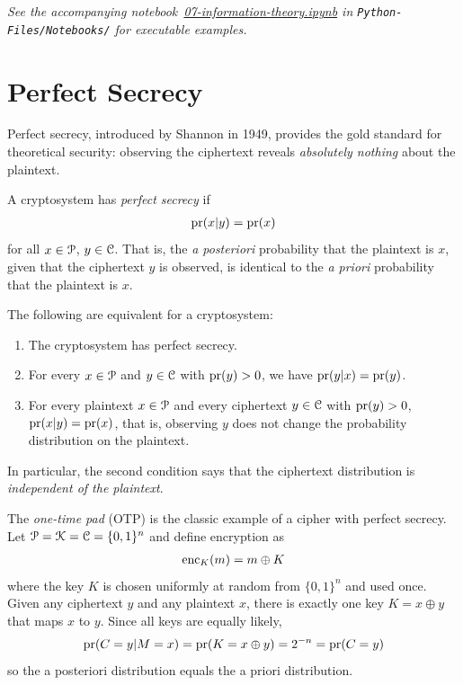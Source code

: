 \documentclass[a4paper, 12pt]{book} %
\newcommand{\notebook}[1]{\begingroup\small\itshape
    See the accompanying notebook~\href{run:./Python-Files/Notebooks/#1}{#1} in \texttt{Python-Files/Notebooks/} for executable examples.%
\endgroup}
\begin{document}
\notebook{07-information-theory.ipynb}

\section{Perfect Secrecy}

Perfect secrecy, introduced by Shannon in 1949, provides the gold standard for
theoretical security: observing the ciphertext reveals \emph{absolutely nothing}
about the plaintext.


\begin{definition}
    A cryptosystem has \emph{perfect secrecy} if 
    \begin{align}
        \operatorname{pr}(x|y) = \operatorname{pr}(x)
    \end{align}
    for all $x \in \EuScript{P}$, $y \in \EuScript{C}$. That is, the \emph{a posteriori} probability that the plaintext is $x$, given that the ciphertext $y$ is observed, is identical to the \emph{a priori} probability that the plaintext is $x$.
\end{definition}

\begin{proposition}
    The following are equivalent for a cryptosystem:
    \begin{enumerate}
        \item The cryptosystem has perfect secrecy.
        \item For every $x \in \EuScript{P}$ and $y \in \EuScript{C}$ with $\operatorname{pr}(y) > 0$, we have $\operatorname{pr}(y | x) = \operatorname{pr}(y)$.
        \item For every plaintext $x \in \EuScript{P}$ and every ciphertext $y \in \EuScript{C}$ with $\operatorname{pr}(y) > 0$, $\operatorname{pr}(x | y) = \operatorname{pr}(x)$, that is, observing $y$ does not change the probability distribution on the plaintext.
    \end{enumerate}
    In particular, the second condition says that the ciphertext distribution is \emph{independent of the plaintext}.
\end{proposition}

\begin{example}
    The \emph{one-time pad} (OTP) is the classic example of a cipher with perfect secrecy. Let $\EuScript{P} = \EuScript{K} = \EuScript{C} = \{0,1\}^n$ and define encryption as
    \begin{align}
        \mathrm{enc}_K(m) = m \oplus K
    \end{align}
    where the key $K$ is chosen uniformly at random from $\{0,1\}^n$ and used once. Given any ciphertext $y$ and any plaintext $x$, there is exactly one key $K = x \oplus y$ that maps $x$ to $y$. Since all keys are equally likely,
    \begin{align}
        \operatorname{pr}(C = y | M = x) = \operatorname{pr}(K = x \oplus y) = 2^{-n} = \operatorname{pr}(C = y)
    \end{align}
    so the a posteriori distribution equals the a priori distribution.
\end{example}
\end{document}
